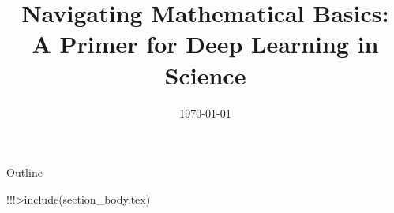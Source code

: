 \documentclass{beamer}
\title{Navigating Mathematical Basics: \\
A Primer for Deep Learning in Science}
\date{\today}
\begin{document}
\begin{frame}
  \titlepage
\end{frame}

\begin{frame}{Outline}
  \tableofcontents
\end{frame}

!!!>include(section_body.tex)
\end{document}
